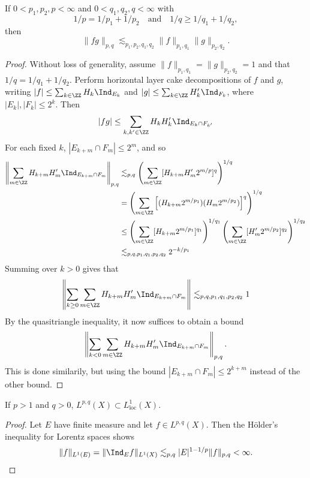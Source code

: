 \begin{theorem}
    If $0 < p_1,p_2,p < \infty$ and $0 < q_1,q_2,q < \infty$ with
    \[ 1/p = 1/p_1 + 1/p_2 \quad \text{and} \quad 1/q \geq 1/q_1 + 1/q_2, \]
    then
    \[ \| f g \|_{p,q} \lesssim_{p_1,p_2,q_1,q_2} \| f \|_{p_1,q_1} \| g \|_{p_2,q_2}. \]
\end{theorem}
\begin{proof}
    Without loss of generality, assume $\| f \|_{p_1,q_1} = \| g \|_{p_2, q_2} = 1$ and that $1/q = 1/q_1 + 1/q_2$. Perform horizontal layer cake decompositions of $f$ and $g$, writing $|f| \leq \sum_{k \in \ZZ} H_k \Ind_{E_k}$ and $|g| \leq \sum_{k \in \ZZ} H_k' \Ind_{F_k}$, where $|E_k|, |F_k| \leq 2^k$. Then
    \[ |fg| \leq \sum_{k,k' \in \ZZ} H_k H_k' \Ind_{E_k \cap F_{k'}} \]
    For each fixed $k$, $|E_{k + m} \cap F_m| \leq 2^m$, and so
    \begin{align*}
        \left\| \sum_{m \in \ZZ} H_{k + m} H_m' \Ind_{E_{k+m} \cap F_m} \right\|_{p,q} &\lesssim_{p,q} \left( \sum_{m \in \ZZ} [H_{k+m} H_m' 2^{m/p}]^q \right)^{1/q}\\
        &= \left( \sum_{m \in \ZZ} \left[ (H_{k+m} 2^{m/p_1}) (H_m 2^{m/p_2}) \right]^q \right)^{1/q}\\
        &\leq \left( \sum_{m \in \ZZ} [H_{k+m} 2^{m/p_1} ]^{q_1} \right)^{1/q_1} \left( \sum_{m \in \ZZ} [H_m' 2^{m/p_2}]^{q_2} \right)^{1/q_2}\\
        &\lesssim_{p,q,p_1,q_1,p_2,q_2} 2^{-k/p_1}\\
    \end{align*}
    Summing over $k > 0$ gives that
    \[ \left\| \sum_{k \geq 0} \sum_{m \in \ZZ} H_{k+m} H_m' \Ind_{E_{k+m} \cap F_m} \right\| \lesssim_{p,q,p_1,q_1,p_2,q_2} 1 \]
    By the quasitriangle inequality, it now suffices to obtain a bound
    \[ \left\| \sum_{k < 0} \sum_{m \in \ZZ} H_{k+m} H_m' \Ind_{E_{k+m} \cap F_m} \right\|_{p,q}. \]
    This is done similarily, but using the bound $|E_{k+m} \cap F_m| \leq 2^{k+m}$ instead of the other bound.
\end{proof}

\begin{corollary}
    If $p > 1$ and $q > 0$, $L^{p,q}(X) \subset L^1_{\text{loc}}(X)$.
\end{corollary}
\begin{proof}
    Let $E$ have finite measure and let $f \in L^{p,q}(X)$. Then the H\"{o}lder's inequality for Lorentz spaces shows
    \[ \| f \|_{L^1(E)} = \| \Ind_E f \|_{L^1(X)} \lesssim_{p,q} |E|^{1 - 1/p} \| f \|_{p,q} < \infty. \qedhere \]
\end{proof}

